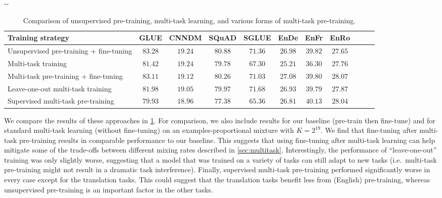 \documentclass[twoside,11pt]{article}
\newlength{\offsetpage}
\newenvironment{widepage}{\begin{adjustwidth}{-\offsetpage}{-\offsetpage}
    \addtolength{\textwidth}{2\offsetpage}}
{\end{adjustwidth}}
\newcommand{\bsl}{\makebox[0pt][r]{\raisebox{0.05em}{$\bigstar\,$}}}
\def\*#1{\mathbf{#1}}
\begin{document}
\begin{table}
\footnotesize
\begin{widepage}
\centering
\begin{tabular}{l c c c c c c c c c c}
\toprule
    Training strategy                             & GLUE        & CNNDM       & SQuAD       & SGLUE       & EnDe        & EnFr        & EnRo    \\
\midrule
    \bsl Unsupervised pre-training + fine-tuning  & $\*{83.28}$ & $\*{19.24}$ & $\*{80.88}$ & $\*{71.36}$ & $\*{26.98}$ & $39.82$     & $27.65$ \\
    Multi-task training                            & $81.42$     & $\*{19.24}$ & $79.78$     & $67.30$     & $25.21$     & $36.30$     & $27.76$ \\
    Multi-task pre-training + fine-tuning          & $\*{83.11}$ & $\*{19.12}$ & $\*{80.26}$ & $\*{71.03}$ & $\*{27.08}$ & $39.80$     & $\*{28.07}$ \\
    Leave-one-out multi-task training              & $81.98$     & $19.05$     & $79.97$     & $\*{71.68}$ & $\*{26.93}$ & $39.79$     & $\*{27.87}$      \\
    Supervised multi-task pre-training             & $79.93$     & $18.96$     & $77.38$     & $65.36$     & $26.81$     & $\*{40.13}$ & $\*{28.04}$ \\
\bottomrule
\end{tabular}
\end{widepage}
\caption{
Comparison of unsupervised pre-training, multi-task learning, and various forms of multi-task pre-training.
}
\label{tab:multitask_ft}
\end{table}

We compare the results of these approaches in \cref{tab:multitask_ft}.
For comparison, we also include results for our baseline (pre-train then fine-tune) and for standard multi-task learning (without fine-tuning) on an examples-proportional mixture with $K=2^{19}$.
We find that fine-tuning after multi-task pre-training results in comparable performance to our baseline.
This suggests that using fine-tuning after multi-task learning can help mitigate some of the trade-offs between different mixing rates described in \cref{sec:multitask}.
Interestingly, the performance of ``leave-one-out'' training was only slightly worse, suggesting that a model that was trained on a variety of tasks can still adapt to new tasks (i.e.\ multi-task pre-training might not result in a dramatic task interference).
Finally, supervised multi-task pre-training performed significantly worse in every case except for the translation tasks.
This could suggest that the translation tasks benefit less from (English) pre-training, whereas unsupervised pre-training is an important factor in the other tasks.
\end{document}
